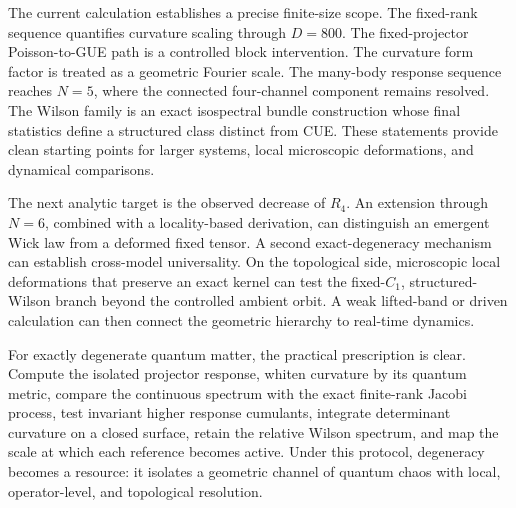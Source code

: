 The current calculation establishes a precise finite-size scope.  The
fixed-rank sequence quantifies curvature scaling through \(D=800\).  The
fixed-projector Poisson-to-GUE path is a controlled block intervention.  The
curvature form factor is treated as a geometric Fourier scale.  The
many-body response sequence reaches \(N=5\), where the connected four-channel
component remains resolved.  The Wilson family is an exact isospectral bundle
construction whose final statistics define a structured class distinct from
CUE.  These statements provide clean starting points for larger systems,
local microscopic deformations, and dynamical comparisons.

The next analytic target is the observed decrease of \(R_4\).  An extension
through \(N=6\), combined with a locality-based derivation, can distinguish an
emergent Wick law from a deformed fixed tensor.  A second exact-degeneracy
mechanism can establish cross-model universality.  On the topological side,
microscopic local deformations that preserve an exact kernel can test the
fixed-\(C_1\), structured-Wilson branch beyond the controlled ambient orbit.
A weak lifted-band or driven calculation can then connect the geometric
hierarchy to real-time dynamics.

For exactly degenerate quantum matter, the practical prescription is clear.
Compute the isolated projector response, whiten curvature by its quantum
metric, compare the continuous spectrum with the exact finite-rank Jacobi
process, test invariant higher response cumulants, integrate determinant
curvature on a closed surface, retain the relative Wilson spectrum, and map
the scale at which each reference becomes active.  Under this protocol,
degeneracy becomes a resource: it isolates a geometric channel of quantum
chaos with local, operator-level, and topological resolution.

